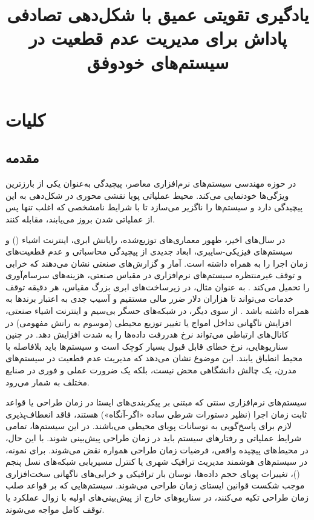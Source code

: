 \documentclass[oneside,openany,phd]{TMU-Thesis}
\title{یادگیری تقویتی عمیق با شکل‌دهی تصادفی پاداش برای مدیریت عدم قطعیت در سیستم‌های خودوفق}
\begin{document}
\AutoPersianDigits
{}

\setcounter{chapter}{0}

\chapter{کلیات}

\section{مقدمه}

در حوزه مهندسی سیستم‌های نرم‌افزاری معاصر، پیچیدگی به‌عنوان یکی از بارزترین ویژگی‌ها خودنمایی می‌کند. محیط عملیاتی پویا نقشی محوری در شکل‌دهی به این پیچیدگی دارد و سیستم‌ها را ناگزیر می‌سازد تا با شرایط نامشخصی که اغلب تنها پس از عملیاتی شدن بروز می‌یابند، مقابله کنند. 

در سال‌های اخیر، ظهور معماری‌های توزیع‌شده، رایانش ابری، اینترنت اشیاء () و سیستم‌های فیزیکی-سایبری، ابعاد جدیدی از پیچیدگی محاسباتی و عدم قطعیت‌های زمان اجرا را به همراه داشته است. آمار و گزارش‌های صنعتی نشان می‌دهند که خرابی و توقف غیرمنتظره سیستم‌های نرم‌افزاری در مقیاس صنعتی، هزینه‌های سرسام‌آوری را تحمیل می‌کند \cite{gartner2014downtime}. به عنوان مثال، در زیرساخت‌های ابری بزرگ مقیاس، هر دقیقه توقف خدمات می‌تواند تا هزاران دلار ضرر مالی مستقیم و آسیب جدی به اعتبار برندها به همراه داشته باشد \cite{gartner2014downtime}. از سوی دیگر، در شبکه‌های حسگر بی‌سیم و اینترنت اشیاء صنعتی، افزایش ناگهانی تداخل امواج یا تغییر توزیع محیطی (موسوم به رانش مفهومی) در کانال‌های ارتباطی می‌تواند نرخ هدررفت داده‌ها را به شدت افزایش دهد. در چنین سناریوهایی، نرخ خطای قابل قبول بسیار کوچک است و سیستم‌ها باید بلافاصله با محیط انطباق یابند. این موضوع نشان می‌دهد که مدیریت عدم قطعیت در سیستم‌های مدرن، یک چالش دانشگاهی محض نیست، بلکه یک ضرورت عملی و فوری در صنایع مختلف به شمار می‌رود.

سیستم‌های نرم‌افزاری سنتی که مبتنی بر پیکربندی‌های ایستا در زمان طراحی یا قواعد ثابت زمان اجرا (نظیر دستورات شرطی ساده «اگر-آنگاه») هستند، فاقد انعطاف‌پذیری لازم برای پاسخ‌گویی به نوسانات پویای محیطی می‌باشند. در این سیستم‌ها، تمامی شرایط عملیاتی و رفتارهای سیستم باید در زمان طراحی پیش‌بینی شوند. با این حال، در محیط‌های پیچیده واقعی، فرضیات زمان طراحی همواره نقض می‌شوند. برای نمونه، در سیستم‌های هوشمند مدیریت ترافیک شهری یا کنترل مسیریابی شبکه‌های نسل پنجم ()، تغییرات پویای حجم داده‌ها، نوسان بار ترافیکی و خرابی‌های ناگهانی سخت‌افزاری موجب شکست قوانین ایستای زمان طراحی می‌شوند. سیستم‌هایی که بر قواعد صلب زمان طراحی تکیه می‌کنند، در سناریوهای خارج از پیش‌بینی‌های اولیه با زوال عملکرد یا توقف کامل مواجه می‌شوند.
\end{document}
